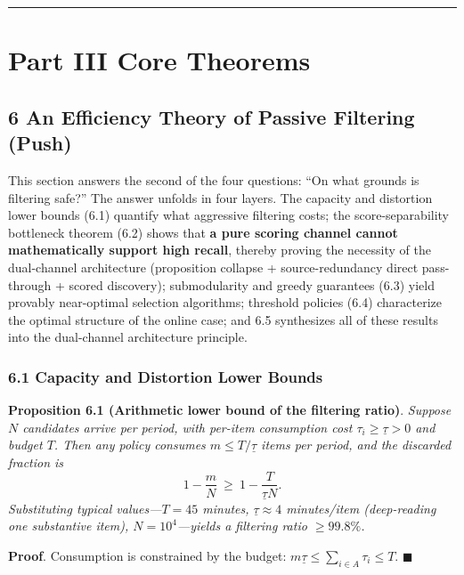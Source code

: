 \documentclass[
  11pt]{article}
\begin{document}
\begin{center}\rule{0.5\linewidth}{0.5pt}\end{center}

\section{Part III Core Theorems}\label{part-iii-core-theorems}

\subsection{6 An Efficiency Theory of Passive Filtering
(Push)}\label{an-efficiency-theory-of-passive-filtering-push}

This section answers the second of the four questions: ``On what grounds
is filtering safe?'' The answer unfolds in four layers. The capacity and
distortion lower bounds (6.1) quantify what aggressive filtering costs;
the score-separability bottleneck theorem (6.2) shows that \textbf{a
pure scoring channel cannot mathematically support high recall}, thereby
proving the necessity of the dual-channel architecture (proposition
collapse + source-redundancy direct pass-through + scored discovery);
submodularity and greedy guarantees (6.3) yield provably near-optimal
selection algorithms; threshold policies (6.4) characterize the optimal
structure of the online case; and 6.5 synthesizes all of these results
into the dual-channel architecture principle.

\subsubsection{6.1 Capacity and Distortion Lower
Bounds}\label{capacity-and-distortion-lower-bounds}

\textbf{Proposition 6.1 (Arithmetic lower bound of the filtering
ratio)}. \emph{Suppose \(N\) candidates arrive per period, with per-item
consumption cost \(\tau_i \ge \underline\tau > 0\) and budget \(T\).
Then any policy consumes \(m \le T/\underline\tau\) items per period,
and the discarded fraction is}
\[1 - \frac{m}{N} \ \ge\ 1 - \frac{T}{\underline\tau N}.\]
\emph{Substituting typical values---\(T = 45\) minutes,
\(\underline\tau \approx 4\) minutes/item (deep-reading one substantive
item), \(N = 10^4\)---yields a filtering ratio \(\ge 99.8\%\).}

\textbf{Proof}. Consumption is constrained by the budget:
\(m\underline\tau \le \sum_{i\in A}\tau_i \le T\). \(\blacksquare\)
\end{document}
